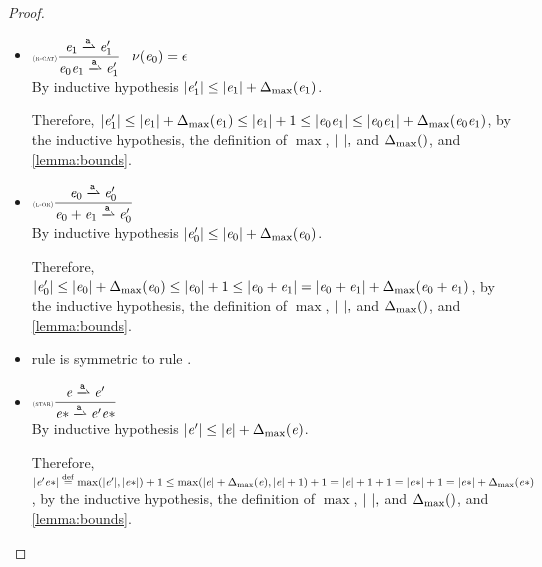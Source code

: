 \begin{proof}
\begin{description}
\begin{itemize}
    \item $\Rule{r-cat}{\re_1\parDer{\sym}\re'_1}{\re_0\catop\re_1\parDer{\sym}\re'_1}{\hasEps{\re_0}=\eps}$\\[2ex]
          By inductive hypothesis ${\mid}{\mathit {e}_1'}{\mid}\leq {\mid}{\ensuremath{\mathit {e}}_1}{\mid}+{\Delta_{\max}}({\mathit {e}_1})$.

          Therefore, ${\mid}{\mathit {e}_1'}{\mid}\leq {\mid}{\ensuremath{\mathit {e}}_1}{\mid}+{\Delta_{\max}}({\mathit {e}_1})\leq{\mid}{\ensuremath{\mathit {e}}_1}{\mid}+1\leq{\mid}{\ensuremath{\mathit {e}}_0\ensuremath{\mathit {e}}_1}{\mid}\leq{\mid}{\ensuremath{\mathit {e}}_0\ensuremath{\mathit {e}}_1}{\mid}+{\Delta_{\max}}({\mathit {e}_0\mathit {e}_1})$, by the inductive hypothesis, the definition of $\max$, ${\mid}{\ }{\mid},$ and ${\Delta_{\max}}({})$, and \cref{lemma:bounds}.

    \item $\Rule{l-or}{\re_0\parDer{\sym}\re'_0}{\re_0\orop\re_1\parDer{\sym}\re'_0}{}$\\[2ex]
          By inductive hypothesis ${\mid}{\mathit {e}_0'}{\mid}\leq {\mid}{\ensuremath{\mathit {e}}_0}{\mid}+{\Delta_{\max}}({\mathit {e}_0})$.

          Therefore, ${\mid}{\mathit {e}_0'}{\mid}\leq {\mid}{\ensuremath{\mathit {e}}_0}{\mid}+{\Delta_{\max}}({\mathit {e}_0})\leq{\mid}{\ensuremath{\mathit {e}}_0}{\mid}+1\leq{\mid}{\ensuremath{\mathit {e}}_0\mathbin{+}\ensuremath{\mathit {e}}_1}{\mid}={\mid}{\mathit {e}_0\mathbin{+}\mathit {e}_1}{\mid}+{\Delta_{\max}}({\mathit {e}_0\mathbin{+}\mathit {e}_1})$, by the inductive hypothesis, the definition of $\max$, ${\mid}{\ }{\mid},$ and ${\Delta_{\max}}({})$, and \cref{lemma:bounds}.
    \item rule  is symmetric to  rule .
    \item $\Rule{star}{\re\parDer{\sym}\re'}{\starop{\re}\parDer{\sym}\re'\catop\starop{\re}}{}$\\[2ex]
          By inductive hypothesis ${\mid}{\mathit {e}'}{\mid}\leq {\mid}{\ensuremath{\mathit {e}}}{\mid}+{\Delta_{\max}}({\mathit {e}})$.

          Therefore, ${\mid}{\mathit {e}'{\mathit {e}}*}{\mid}\stackrel{\mathrm{def}}{=}\max({\mid}{\mathit {e}'}{\mid},{{\mid}{{\mathit {e}}*}{\mid}})+1\leq \max({\mid}{\mathit {e}}{\mid}+{\Delta_{\max}}({\mathit {e}}),{{\mid}{\mathit {e}}{\mid}}+1)+1={\mid}{\mathit {e}}{\mid}+1+1={\mid}{{\mathit {e}}*}{\mid}+1={\mid}{{\mathit {e}}*}{\mid}+{\Delta_{\max}}({{\mathit {e}}*})$, by the inductive hypothesis, the definition of $\max$, ${\mid}{\ }{\mid},$ and ${\Delta_{\max}}({})$, and \cref{lemma:bounds}.
   \end{itemize}
 \end{description}
\end{proof}

